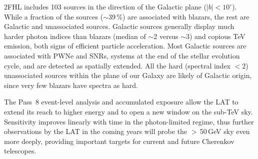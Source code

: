
2FHL includes 103 sources in the direction of the Galactic plane ($|b|<10^{\circ}$).
While a fraction of the sources ($\sim$39\,\%) are associated with blazars, the rest
are Galactic and unassociated sources. Galactic sources generally display
much harder photon indices than blazars (median of $\sim$2 versus $\sim$3)
and copious TeV emission, both signs of efficient particle acceleration.
Most Galactic sources are associated with PWNe and SNRs, systems at the end
of the stellar evolution cycle, and are detected as spatially extended.
All the hard (spectral index $<2$) unassociated  sources within the plane
of our Galaxy are likely of Galactic origin, since very few blazars 
have spectra as hard.

The Pass~8 event-level analysis  and accumulated exposure allow the LAT to extend its reach
to higher energy and to open a new window on the sub-TeV sky. Sensitivity improves linearly with time in the photon-limited regime, thus 
further observations by the LAT in the coming years
will probe the $>$\,50\,GeV sky even more deeply, providing
important targets for current and future 
Cherenkov telescopes.

